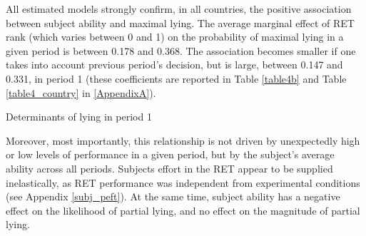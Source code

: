 \documentclass[12pt]{article}
\begin{document}
\par All estimated models strongly confirm, in all countries, the positive association between subject ability and maximal lying. The average marginal effect of RET rank (which varies between 0 and 1) on the probability of maximal lying in a given period is between 0.178 and 0.368. The association becomes smaller if one takes into account previous period's decision, but is large, between 0.147 and 0.331, in period 1 (these coefficients are reported in Table \ref{table4b} and Table \ref{table4_country} in \ref{AppendixA}). 

\begin{table}[ht]
\begin{center}
\tiny

\end{center}
\caption{Determinants of lying in period 1}
\label{table4b}
\end{table}

\par Moreover, most importantly, this relationship is not driven by unexpectedly high or low levels of performance in a given period, but by the subject's average ability across all periods.\footnotemark{}
 Subjects effort in the RET appear to be supplied inelastically, as RET performance was independent from experimental conditions (see Appendix \ref{subj_peft}). At the same time, subject ability has a negative effect on the likelihood of partial lying, and no effect on the magnitude of partial lying.\footnotemark{}

\end{document}
